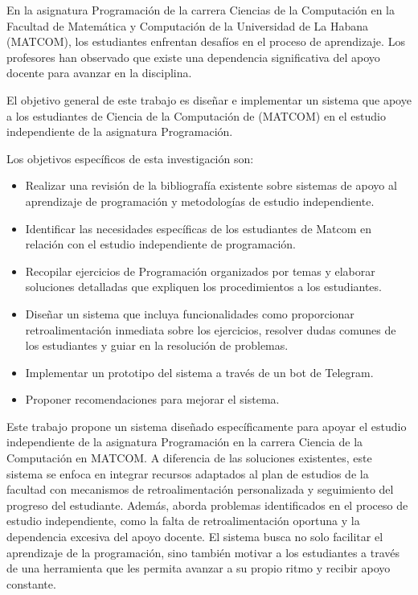 \documentclass{article}
\begin{document}
En la asignatura Programación de la carrera Ciencias de la Computación en la Facultad de Matemática y Computación de la Universidad de La Habana (\mbox{MATCOM}), los estudiantes enfrentan desafíos en el proceso de aprendizaje. Los profesores han observado que existe una dependencia significativa del apoyo docente para avanzar en la disciplina.

El objetivo general de este trabajo es diseñar e implementar un sistema que apoye a los estudiantes de Ciencia de la Computación de (\mbox{MATCOM}) en el estudio independiente de la asignatura Programación.

Los objetivos específicos de esta investigación son:
\begin{itemize}
    \item Realizar una revisión de la bibliografía existente sobre sistemas de apoyo al aprendizaje de programación y metodologías de estudio independiente.
    \item Identificar las necesidades específicas de los estudiantes de Matcom en relación con el estudio independiente de programación.
    \item Recopilar ejercicios de Programación organizados por temas y elaborar soluciones detalladas que expliquen los procedimientos a los estudiantes.
    \item Diseñar un sistema que incluya funcionalidades como proporcionar retroalimentación inmediata sobre los ejercicios, resolver dudas comunes de los estudiantes y guiar en la resolución de problemas.
    \item Implementar un prototipo del sistema a través de un bot de Telegram.
    \item Proponer recomendaciones para mejorar el sistema.
\end{itemize}

Este trabajo propone un sistema diseñado específicamente para apoyar el estudio independiente de la asignatura Programación en la carrera Ciencia de la Computación en \mbox{MATCOM}. A diferencia de las soluciones existentes, este sistema se enfoca en integrar recursos adaptados al plan de estudios de la facultad con mecanismos de retroalimentación personalizada y seguimiento del progreso del estudiante. Además, aborda problemas identificados en el proceso de estudio independiente, como la falta de retroalimentación oportuna y la dependencia excesiva del apoyo docente. El sistema busca no solo facilitar el aprendizaje de la programación, sino también motivar a los estudiantes a través de una herramienta que les permita avanzar a su propio ritmo y recibir apoyo constante.
\end{document}
